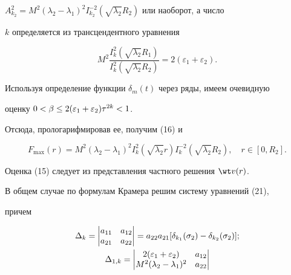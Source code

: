 \begin{pf}
$A^2_{k_2}=M^2(\lambda_2-\lambda_1)^2I^{-2}_{k_2} 


(\sqrt{\lambda_2}R_2)$ или наоборот, а число 


$k$ определяется из трансцендентного уравнения 


$$ 


M^2\frac{I^2_k(\sqrt{\lambda_2}R_1)} 


{I^2_k(\sqrt{\lambda_2}R_2)}=2(\varepsilon_1+\varepsilon_2). 


$$ 


 


Используя определение функции $\delta_m(t)$ через ряды, имеем очевидную 


оценку $0<\beta\le\linebreak 2(\varepsilon_1+\varepsilon_2)\tau^{2k}<1$.


Отсюда, прологарифмировав ее, получим (16) и 


$$ 


F_{\max}(r)=M^2(\lambda_2-\lambda_1)^2I^2_k(\sqrt{\lambda_2}r) 


I^{-2}_k(\sqrt{\lambda_2}R_2),\quad r\in[0,R_2]. 


$$ 


Оценка (15) следует из представления частного решения $\wt v(r)$. 


В общем случае по формулам Крамера решим систему уравнений (21),


причем


\begin{gather*}


\allowdisplaybreaks 


\Delta_k= 


\begin{vmatrix} 


a_{11} & a_{12} \\ a_{21} & a_{22} 


\end{vmatrix} 


=a_{22}a_{21}[\delta_{k_1}(\sigma_2)-\delta_{k_2}(\sigma_2)];\\


%


\Delta_{1,k}= 


\begin{vmatrix} 


2(\varepsilon_1+\varepsilon_2) & a_{12} \\ 


M^2(\lambda_2-\lambda_1)^2 & a_{22} 



\end{vmatrix}
\end{gather*}
\end{pf}
